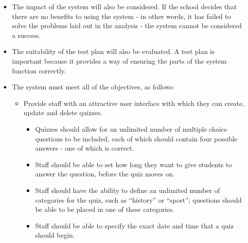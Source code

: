 \begin{itemize}
\item The impact of the system will also be considered. If the school decides that there are no benefits to using the system - in other words, it has failed to solve the problems laid out in the analysis - the system cannot be considered a success.

\item The suitability of the test plan will also be evaluated. A test plan is important because it provides a way of ensuring the parts of the system function correctly.

\item The system must meet all of the objectives, as follows:

\begin{itemize}
	\item Provide staff with an attractive user interface with which they can create, update and delete quizzes.
		\begin{itemize}
			\item Quizzes should allow for an unlimited number of multiple choice questions to be included, each of which should contain four possible answers - one of which is correct.
			\item Staff should be able to set how long they want to give students to answer the question, before the quiz moves on.
			\item Staff should have the ability to define an unlimited number of categories for the quiz, such as ``history'' or ``sport''; questions should be able to be placed in one of these categories.
			\item Staff should be able to specify the exact date and time that a quiz should begin.
		\end{itemize}


\end{itemize}
\end{itemize}
